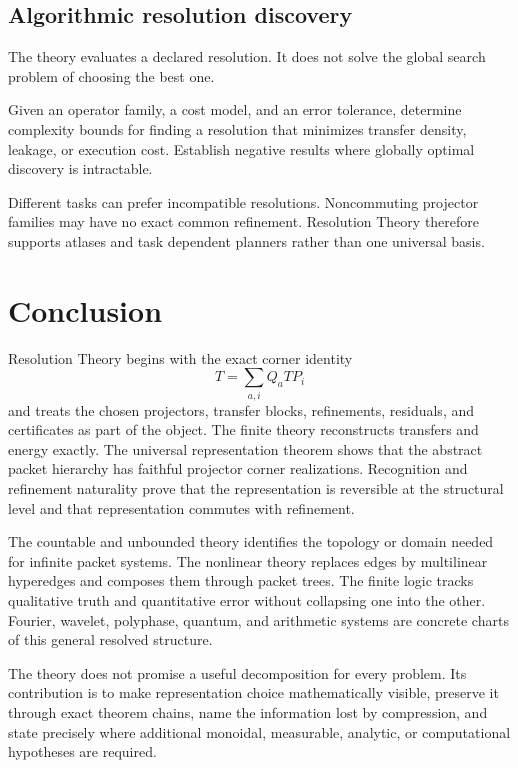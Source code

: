 \documentclass{aomart}
\theoremstyle{definition}
\theoremstyle{remark}
\begin{document}
\subsection{Algorithmic resolution discovery}

The theory evaluates a declared resolution. It does not solve the global search problem of choosing the best one.

\begin{problem}\label{prob:discovery}
Given an operator family, a cost model, and an error tolerance, determine complexity bounds for finding a resolution that minimizes transfer density, leakage, or execution cost. Establish negative results where globally optimal discovery is intractable.
\end{problem}

\begin{remark}\label{rem:no_universal_chart}
Different tasks can prefer incompatible resolutions. Noncommuting projector families may have no exact common refinement. Resolution Theory therefore supports atlases and task dependent planners rather than one universal basis.
\end{remark}

\section{Conclusion}\label{sec:conclusion}

Resolution Theory begins with the exact corner identity
\[
 T=\sum_{a,i}Q_aTP_i
\]
and treats the chosen projectors, transfer blocks, refinements, residuals, and certificates as part of the object. The finite theory reconstructs transfers and energy exactly. The universal representation theorem shows that the abstract packet hierarchy has faithful projector corner realizations. Recognition and refinement naturality prove that the representation is reversible at the structural level and that representation commutes with refinement.

The countable and unbounded theory identifies the topology or domain needed for infinite packet systems. The nonlinear theory replaces edges by multilinear hyperedges and composes them through packet trees. The finite logic tracks qualitative truth and quantitative error without collapsing one into the other. Fourier, wavelet, polyphase, quantum, and arithmetic systems are concrete charts of this general resolved structure.

The theory does not promise a useful decomposition for every problem. Its contribution is to make representation choice mathematically visible, preserve it through exact theorem chains, name the information lost by compression, and state precisely where additional monoidal, measurable, analytic, or computational hypotheses are required.
\end{document}
